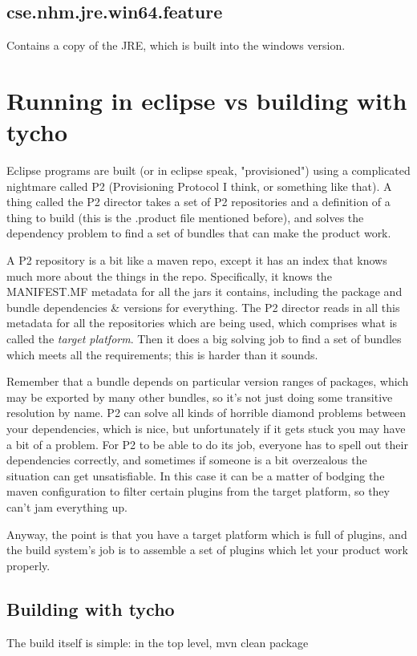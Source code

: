 \documentclass[11pt]{article}
\begin{document}
\subsection{cse.nhm.jre.win64.feature}
\label{sec-1-10}
Contains a copy of the JRE, which is built into the windows version.
\section{Running in eclipse vs building with tycho}
\label{sec-2}
Eclipse programs are built (or in eclipse speak, "provisioned") using a complicated nightmare called P2 (Provisioning Protocol I think, or something like that). A thing called the P2 director takes a set of P2 repositories and a definition of a thing to build (this is the .product file mentioned before), and solves the dependency problem to find a set of bundles that can make the product work.

A P2 repository is a bit like a maven repo, except it has an index that knows much more about the things in the repo. Specifically, it knows the MANIFEST.MF metadata for all the jars it contains, including the package and bundle dependencies \& versions for everything. The P2 director reads in all this metadata for all the repositories which are being used, which comprises what is called the \emph{target platform}. Then it does a big solving job to find a set of bundles which meets all the requirements; this is harder than it sounds.

Remember that a bundle depends on particular version ranges of packages, which may be exported by many other bundles, so it's not just doing some transitive resolution by name. P2 can solve all kinds of horrible diamond problems between your dependencies, which is nice, but unfortunately if it gets stuck you may have a bit of a problem. For P2 to be able to do its job, everyone has to spell out their dependencies correctly, and sometimes if someone is a bit overzealous the situation can get unsatisfiable. In this case it can be a matter of bodging the maven configuration to filter certain plugins from the target platform, so they can't jam everything up.

Anyway, the point is that you have a target platform which is full of plugins, and the build system's job is to assemble a set of plugins which let your product work properly.
\subsection{Building with tycho}
\label{sec-2-1}
The build itself is simple: in the top level, mvn clean package
\end{document}
